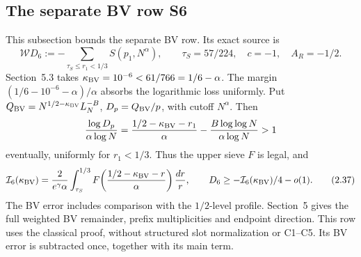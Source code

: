 \subsection*{The separate BV row S6}
This subsection bounds the separate BV row.
Its exact source is
\[
 \mathcal W D_6:=-\sum_{\tau_S\le r_1<1/3}S(p_1,N^\alpha),\qquad
 \tau_S=57/224,\quad c=-1,\quad A_R=-1/2.
 \tag{2.36}\label{p2:eq:2.36}
\]
Section~5.3 takes $\kappa_{\rm BV}=10^{-6}<61/766=1/6-\alpha$.
The margin $(1/6-10^{-6}-\alpha)/\alpha$ absorbs the logarithmic loss uniformly.
Put $Q_{\rm BV}=N^{1/2-\kappa_{\rm BV}}L_N^{-B}$,
$D_p=Q_{\rm BV}/p$, with cutoff $N^\alpha$.
Then
\[
 \frac{\log D_p}{\alpha\log N}
 =\frac{1/2-\kappa_{\rm BV}-r_1}{\alpha}
  -\frac{B\log\log N}{\alpha\log N}>1
\]
eventually, uniformly for $r_1<1/3$.
Thus the upper sieve $F$ is legal, and
\[
 \mathcal I_6(\kappa_{\rm BV})=
 \frac{2}{e^\gamma\alpha}\int_{\tau_S}^{1/3}
 F\!\left(\frac{1/2-\kappa_{\rm BV}-r}{\alpha}\right)\frac{dr}{r},
 \qquad D_6\ge-\mathcal I_6(\kappa_{\rm BV})/4-o(1).
 \tag{2.37}\label{p2:eq:2.37}
\]
The BV error includes comparison with the $1/2$-level profile.
Section~5 gives the full weighted BV remainder, prefix multiplicities and endpoint direction.
This row uses the classical proof, without structured slot normalization or C1--C5.
Its BV error is subtracted once, together with its main term.


